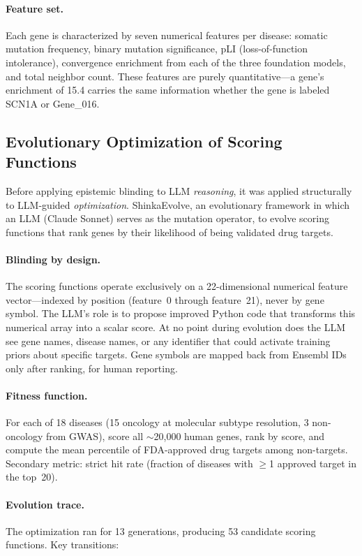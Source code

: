 \documentclass[sigconf, nonacm]{acmart}
\begin{document}
\paragraph{Feature set.} Each gene is characterized by seven numerical features per disease: somatic mutation frequency, binary mutation significance, pLI (loss-of-function intolerance), convergence enrichment from each of the three foundation models, and total neighbor count. These features are purely quantitative---a gene's enrichment of 15.4 carries the same information whether the gene is labeled SCN1A or Gene\_016.

\subsection{Evolutionary Optimization of Scoring Functions}

Before applying epistemic blinding to LLM \textit{reasoning}, it was applied structurally to LLM-guided \textit{optimization}. ShinkaEvolve, an evolutionary framework in which an LLM (Claude Sonnet) serves as the mutation operator, to evolve scoring functions that rank genes by their likelihood of being validated drug targets.

\paragraph{Blinding by design.} The scoring functions operate exclusively on a 22-dimensional numerical feature vector---indexed by position (feature~0 through feature~21), never by gene symbol. The LLM's role is to propose improved Python code that transforms this numerical array into a scalar score. At no point during evolution does the LLM see gene names, disease names, or any identifier that could activate training priors about specific targets. Gene symbols are mapped back from Ensembl IDs only after ranking, for human reporting.

\paragraph{Fitness function.} For each of 18 diseases (15 oncology at molecular subtype resolution, 3 non-oncology from GWAS), score all $\sim$20,000 human genes, rank by score, and compute the mean percentile of FDA-approved drug targets among non-targets. Secondary metric: strict hit rate (fraction of diseases with $\geq$1 approved target in the top~20).

\paragraph{Evolution trace.} The optimization ran for 13 generations, producing 53 candidate scoring functions. Key transitions:
\end{document}
